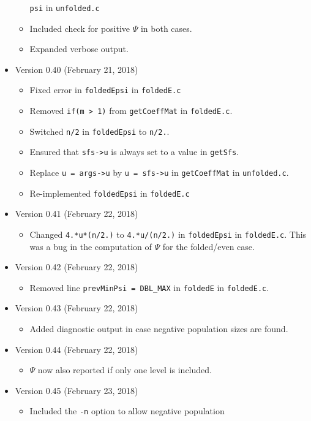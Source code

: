 \documentclass[a4paper]{article}
\newcommand{\ty}{\texttt}
\begin{document}
\begin{itemize}
\begin{itemize}
    \ty{psi} in \ty{unfolded.c}
  \item Included check for positive $\Psi$ in both cases.
  \item Expanded verbose output.
  \end{itemize}
\item Version 0.40 (February 21, 2018)
  \begin{itemize}
  \item Fixed error in \ty{foldedEpsi} in \ty{foldedE.c}
  \item Removed \ty{if(m > 1)} from \ty{getCoeffMat} in
    \ty{foldedE.c}.
  \item Switched \ty{n/2} in \ty{foldedEpsi} to \ty{n/2.}.
  \item Ensured that \ty{sfs->u} is always set to a value in
    \ty{getSfs}.
  \item Replace \verb+u = args->u+ by \verb+u = sfs->u+ in
    \ty{getCoeffMat} in \ty{unfolded.c}.
  \item Re-implemented \ty{foldedEpsi} in \ty{foldedE.c}
  \end{itemize}
\item Version 0.41 (February 22, 2018)
  \begin{itemize}
    \item Changed \ty{4.*u*(n/2.)} to \ty{4.*u/(n/2.)} in
      \ty{foldedEpsi} in \ty{foldedE.c}. This was a bug in the
      computation of $\Psi$ for the folded/even case.
  \end{itemize}
\item Version 0.42 (February 22, 2018)
  \begin{itemize}
    \item Removed line \ty{prevMinPsi = DBL\_MAX} in \ty{foldedE} in \ty{foldedE.c}.
  \end{itemize}
\item Version 0.43 (February 22, 2018)
  \begin{itemize}
    \item Added diagnostic output in case negative population sizes
      are found.
  \end{itemize}
\item Version 0.44 (February 22, 2018)
  \begin{itemize}
  \item $\Psi$ now also reported if only one level is included.
  \end{itemize}
\item Version 0.45 (February 23, 2018)
  \begin{itemize}
  \item Included the \ty{-n} option to allow negative population

\end{itemize}
\end{itemize}
\end{document}
